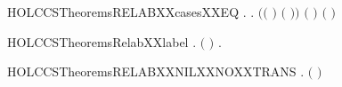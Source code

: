 \begin{SaveVerbatim}{HOLCCSTheoremsRELABXXcasesXXEQ}
\HOLTokenTurnstile{} \HOLSymConst{\HOLTokenForall{}}   .
          \HOLTokenTransBegin{}\HOLTokenTransEnd {} \HOLSymConst{\HOLTokenEquiv{}}
       \HOLSymConst{\HOLTokenExists{}}   .
           \ensuremath{(}\ensuremath{(} \HOLSymConst{\ensuremath{=}} \ensuremath{)} \HOLSymConst{\HOLTokenConj{}} \ensuremath{(} \HOLSymConst{\ensuremath{=}} \ensuremath{)}\ensuremath{)} \HOLSymConst{\HOLTokenConj{}} \ensuremath{(} \HOLSymConst{\ensuremath{=}}   \ensuremath{)} \HOLSymConst{\HOLTokenConj{}}
           \ensuremath{(} \HOLSymConst{\ensuremath{=}}   \ensuremath{)} \HOLSymConst{\HOLTokenConj{}}  \HOLTokenTransBegin{}\HOLTokenTransEnd {}
\end{SaveVerbatim}
\newcommand{\HOLCCSTheoremsRELABXXcasesXXEQ}{\UseVerbatim{HOLCCSTheoremsRELABXXcasesXXEQ}}
\begin{SaveVerbatim}{HOLCCSTheoremsRelabXXlabel}
\HOLTokenTurnstile{} \HOLSymConst{\HOLTokenForall{}}  . \ensuremath{(}   \HOLSymConst{\ensuremath{=}}  \ensuremath{)} \HOLSymConst{\HOLTokenImp{}} \HOLSymConst{\HOLTokenExists{}}.  \HOLSymConst{\ensuremath{=}}  
\end{SaveVerbatim}
\newcommand{\HOLCCSTheoremsRelabXXlabel}{\UseVerbatim{HOLCCSTheoremsRelabXXlabel}}
\begin{SaveVerbatim}{HOLCCSTheoremsRELABXXNILXXNOXXTRANS}
\HOLTokenTurnstile{} \HOLSymConst{\HOLTokenForall{}}  . \HOLSymConst{\HOLTokenNeg{}}\ensuremath{(}   \HOLTokenTransBegin{}\HOLTokenTransEnd {}\ensuremath{)}
\end{SaveVerbatim}
\newcommand{\HOLCCSTheoremsRELABXXNILXXNOXXTRANS}{\UseVerbatim{HOLCCSTheoremsRELABXXNILXXNOXXTRANS}}
